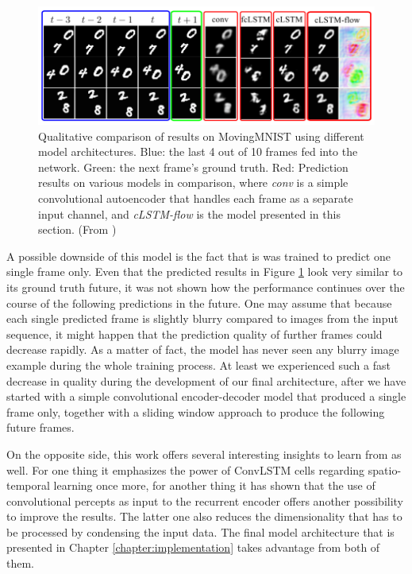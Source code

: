 \begin{figure}[htb]
	\centering
	\includegraphics[width=1.0\linewidth]{figures/related/spat_temp_results.png} 
	\caption[Qualitative MovingMNIST Results of LSTM Models]{Qualitative comparison of results on MovingMNIST using different model architectures. Blue: the last 4 out of 10 frames fed into the network. Green: the next frame's ground truth. Red: Prediction results on various models in comparison, where \textit{conv} is a simple convolutional autoencoder that handles each frame as a separate input channel, and \textit{cLSTM-flow} is the model presented in this section. (From \parencite{spat_temp_video_autoenc})} \label{fig:spatiotemp_results}
\end{figure}

A possible downside of this model is the fact that is was trained to predict one single frame only. Even that the predicted results in Figure \ref{fig:spatiotemp_results} look very similar to its ground truth future, it was not shown how the performance continues over the course of the following predictions in the future. One may assume that because each single predicted frame is slightly blurry compared to images from the input sequence, it might happen that the prediction quality of further frames could decrease rapidly. As a matter of fact, the model has never seen any blurry image example during the whole training process. At least we experienced such a fast decrease in quality during the development of our final architecture, after we have started with a simple convolutional encoder-decoder model that produced a single frame only, together with a sliding window approach to produce the following future frames.

On the opposite side, this work offers several interesting insights to learn from as well. For one thing it emphasizes the power of ConvLSTM cells regarding spatio-temporal learning once more, for another thing it has shown that the use of convolutional percepts as input to the recurrent encoder offers another possibility to improve the results. The latter one also reduces the dimensionality that has to be processed by condensing the input data. The final model architecture that is presented in Chapter \ref{chapter:implementation} takes advantage from both of them.


